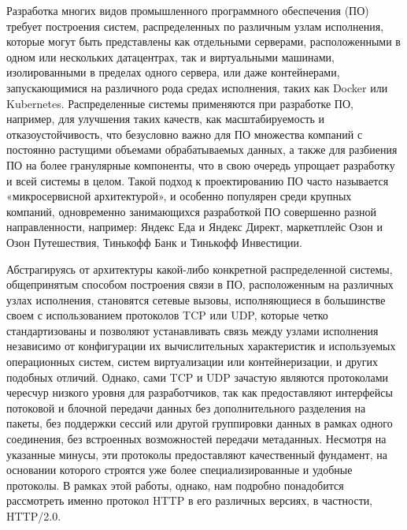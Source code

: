 \documentclass[times]{itmo-student-thesis}
\begin{document}

\tableofcontents

\startprefacepage

Разработка многих видов промышленного программного обеспечения (ПО) требует построения систем, распределенных по различным узлам исполнения,
которые могут быть представлены как отдельными серверами, расположенными в одном или нескольких датацентрах, так и виртуальными машинами, изолированными в пределах одного сервера,
или даже контейнерами, запускающимися на различного рода средах исполнения, таких как Docker или Kubernetes.
Распределенные системы применяются при разработке ПО, например, для улучшения таких качеств, как масштабируемость и отказоустойчивость,
что безусловно важно для ПО множества компаний с постоянно растущими объемами обрабатываемых данных,
а также для разбиения ПО на более гранулярные компоненты, что в свою очередь упрощает разработку и всей системы в целом.
Такой подход к проектированию ПО часто называется «микросервисной архитектурой», и особенно популярен среди крупных компаний,
одновременно занимающихся разработкой ПО совершенно разной направленности, например: Яндекс Еда и Яндекс Директ, маркетплейс Озон и Озон Путешествия, Тинькофф Банк и Тинькофф Инвестиции. 

Абстрагируясь от архитектуры какой-либо конкретной распределенной системы, общепринятым способом построения связи в ПО, расположенным на различных узлах исполнения,
становятся сетевые вызовы, исполняющиеся в большинстве своем с использованием протоколов TCP или UDP, которые четко стандартизованы и позволяют устанавливать связь между
узлами исполнения независимо от конфигурации их вычислительных характеристик и используемых операционных систем, систем виртуализации или контейнеризации, и других подобных отличий.
Однако, сами TCP и UDP зачастую являются протоколами чересчур низкого уровня для разработчиков, так как предоставляют интерфейсы потоковой и блочной передачи данных
без дополнительного разделения на пакеты, без поддержки сессий или другой группировки данных в рамках одного соединения, без встроенных возможностей передачи метаданных.
Несмотря на указанные минусы, эти протоколы предоставляют качественный фундамент, на основании которого строятся уже более специализированные и удобные протоколы.
В рамках этой работы, однако, нам подробно понадобится рассмотреть именно протокол HTTP в его различных версиях, в частности, HTTP/2.0.
\end{document}
